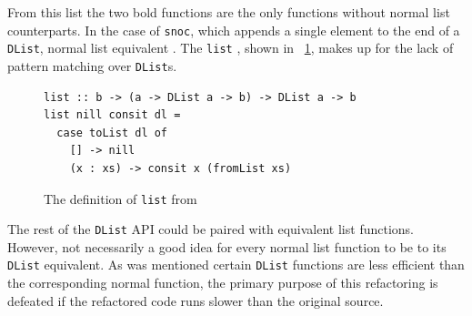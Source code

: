From this list the two bold functions are the only functions without normal list counterparts. In the case of \texttt{snoc}, which appends a single element to the end of a \texttt{DList}, \DIFdelbegin {}\DIFdelend \DIFaddbegin {}\DIFaddend normal list equivalent \DIFdelbegin {}\texttt{} %
\DIFdelend \DIFaddbegin {}\DIFaddend . The \texttt{list} \DIFaddbegin {}\DIFaddend , shown in \DIFdelbegin {}\DIFdelend \DIFaddbegin {}\DIFaddend ~\ref{dListList}, makes up for the lack of pattern matching over \texttt{DList}s. \DIFaddbegin {}\texttt{} \texttt{}\texttt{}\texttt{} \texttt{}\texttt{}\texttt{} \texttt{} \DIFaddend 

\begin{figure}[t]
\begin{lstlisting}
list :: b -> (a -> DList a -> b) -> DList a -> b
list nill consit dl =
  case toList dl of
    [] -> nill
    (x : xs) -> consit x (fromList xs)
\end{lstlisting}
\caption{The definition of \texttt{list} from~\citep{dlist}}
\label{dListList}
\end{figure}

The rest of the \texttt{DList} API could be paired with equivalent list functions. However, \DIFdelbegin {}\DIFdelend \DIFaddbegin {}\DIFaddend not necessarily a good idea for every normal list function to be \DIFdelbegin {}\DIFdelend \DIFaddbegin {}\DIFaddend to its \texttt{DList} equivalent. As was mentioned \DIFaddbegin {}\DIFaddend certain \texttt{DList} functions are less efficient than the corresponding normal function, \DIFaddbegin {}\DIFaddend the primary purpose of this refactoring is defeated if the refactored code runs slower than the original source.

